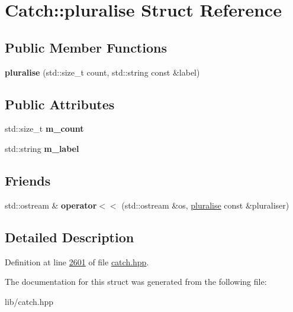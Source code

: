 \hypertarget{structCatch_1_1pluralise}{}\section{Catch\+::pluralise Struct Reference}
\label{structCatch_1_1pluralise}
\subsection*{Public Member Functions}
\begin{DoxyCompactItemize}
\item 
\mbox{\label{structCatch_1_1pluralise_a5c55e22de2416cfe416edf715c6b9234}} 
{\bfseries pluralise} (std\+::size\+\_\+t count, std\+::string const \&label)
\end{DoxyCompactItemize}
\subsection*{Public Attributes}
\begin{DoxyCompactItemize}
\item 
\mbox{\label{structCatch_1_1pluralise_a4dce2fa13ec6f00fac09b2418265441e}} 
std\+::size\+\_\+t {\bfseries m\+\_\+count}
\item 
\mbox{\label{structCatch_1_1pluralise_a8849cbdd3f11ebe7747597c8644e8793}} 
std\+::string {\bfseries m\+\_\+label}
\end{DoxyCompactItemize}
\subsection*{Friends}
\begin{DoxyCompactItemize}
\item 
\mbox{\label{structCatch_1_1pluralise_aa7dac6b165514c1f85e0695d678fdef5}} 
std\+::ostream \& {\bfseries operator$<$$<$} (std\+::ostream \&os, \mbox{\hyperlink{structCatch_1_1pluralise}{pluralise}} const \&pluraliser)
\end{DoxyCompactItemize}


\subsection{Detailed Description}


Definition at line \mbox{\hyperlink{catch_8hpp_source_l02601}{2601}} of file \mbox{\hyperlink{catch_8hpp_source}{catch.\+hpp}}.



The documentation for this struct was generated from the following file\+:\begin{DoxyCompactItemize}
\item 
lib/catch.\+hpp\end{DoxyCompactItemize}
